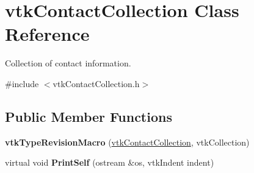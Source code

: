 \hypertarget{classvtkContactCollection}{
\section{vtkContactCollection Class Reference}
\label{classvtkContactCollection}
}


Collection of contact information.  


{\ttfamily \#include $<$vtkContactCollection.h$>$}\subsection*{Public Member Functions}
\begin{DoxyCompactItemize}
\item 
\hypertarget{classvtkContactCollection_aa1965951c55bd491c4d9fe629da9870b}{
{\bfseries vtkTypeRevisionMacro} (\hyperlink{classvtkContactCollection}{vtkContactCollection}, vtkCollection)}
\label{classvtkContactCollection_aa1965951c55bd491c4d9fe629da9870b}

\item 
\hypertarget{classvtkContactCollection_a0fa034d882bea337b33eee17cee78c18}{
virtual void {\bfseries PrintSelf} (ostream \&os, vtkIndent indent)}
\label{classvtkContactCollection_a0fa034d882bea337b33eee17cee78c18}


\end{DoxyCompactItemize}
